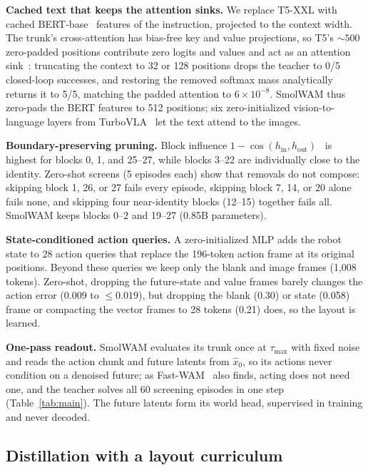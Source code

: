 \documentclass{article}
\newcommand{\smol}{SmolWAM\xspace}
\begin{document}
\textbf{Cached text that keeps the attention sinks.}
We replace T5-XXL with cached BERT-base~\citep{devlin2019bert} features of the instruction, projected to the context width.
The trunk's cross-attention has bias-free key and value projections, so T5's ${\sim}500$ zero-padded positions contribute zero logits and values and act as an attention sink~\citep{xiao2024streamingllm}: truncating the context to 32 or 128 positions drops the teacher to 0/5 closed-loop successes, and restoring the removed softmax mass analytically returns it to 5/5, matching the padded attention to $6{\times}10^{-8}$.
\smol thus zero-pads the BERT features to 512 positions; six zero-initialized vision-to-language layers from TurboVLA~\citep{xie2026turbovla} let the text attend to the images.

\textbf{Boundary-preserving pruning.}
Block influence $1-\cos(h_{\text{in}},h_{\text{out}})$~\citep{men2025shortgpt} is highest for blocks 0, 1, and 25--27, while blocks 3--22 are individually close to the identity.
Zero-shot screens (5 episodes each) show that removals do not compose: skipping block 1, 26, or 27 fails every episode, skipping block 7, 14, or 20 alone fails none, and skipping four near-identity blocks (12--15) together fails all.
\smol keeps blocks 0--2 and 19--27 (0.85B parameters).

\textbf{State-conditioned action queries.}
A zero-initialized MLP adds the robot state to 28 action queries that replace the 196-token action frame at its original positions.
Beyond these queries we keep only the blank and image frames (1,008 tokens).
Zero-shot, dropping the future-state and value frames barely changes the action error (0.009 to ${\le}0.019$), but dropping the blank (0.30) or state (0.058) frame or compacting the vector frames to 28 tokens (0.21) does, so the layout is learned.

\textbf{One-pass readout.}
\smol evaluates its trunk once at $\tau_{\max}$ with fixed noise and reads the action chunk and future latents from $\hat{x}_0$, so its actions never condition on a denoised future; as Fast-WAM~\citep{yuan2026fastwam} also finds, acting does not need one, and the teacher solves all 60 screening episodes in one step (Table~\ref{tab:main}).
The future latents form its world head, supervised in training and never decoded.

\subsection{Distillation with a layout curriculum}
\label{sec:training}
\end{document}
